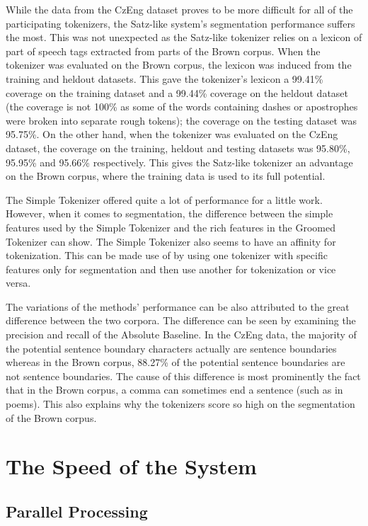 While the data from the CzEng dataset proves to be more difficult for all of
the participating tokenizers, the Satz-like system's segmentation performance
suffers the most. This was not unexpected as the Satz-like tokenizer relies on
a lexicon of part of speech tags extracted from parts of the Brown corpus. When
the tokenizer was evaluated on the Brown corpus, the lexicon was induced from
the training and heldout datasets. This gave the tokenizer's lexicon a 99.41\%
coverage on the training dataset and a 99.44\% coverage on the heldout dataset
(the coverage is not 100\% as some of the words containing dashes or
apostrophes were broken into separate rough tokens); the coverage on the
testing dataset was 95.75\%. On the other hand, when the tokenizer was
evaluated on the CzEng dataset, the coverage on the training, heldout and
testing datasets was 95.80\%, 95.95\% and 95.66\% respectively. This gives the
Satz-like tokenizer an advantage on the Brown corpus, where the training data
is used to its full potential.

The Simple Tokenizer offered quite a lot of performance for a little work.
However, when it comes to segmentation, the difference between the simple
features used by the Simple Tokenizer and the rich features in the Groomed
Tokenizer can show. The Simple Tokenizer also seems to have an affinity for
tokenization. This can be made use of by using one tokenizer with specific
features only for segmentation and then use another for tokenization or vice
versa.

The variations of the methods' performance can be also attributed to the great
difference between the two corpora. The difference can be seen by examining the
precision and recall of the Absolute Baseline. In the CzEng data, the majority of
the potential sentence boundary characters actually are sentence boundaries
whereas in the Brown corpus, 88.27\% of the potential sentence boundaries are
not sentence boundaries. The cause of this difference is most prominently the
fact that in the Brown corpus, a comma can sometimes end a sentence (such as in
poems). This also explains why the tokenizers score so high on the segmentation
of the Brown corpus.

\section{The Speed of the System}
\label{sec:eval-spd}

\subsection{Parallel Processing}
\label{ssec:eval-spd-parallel}

